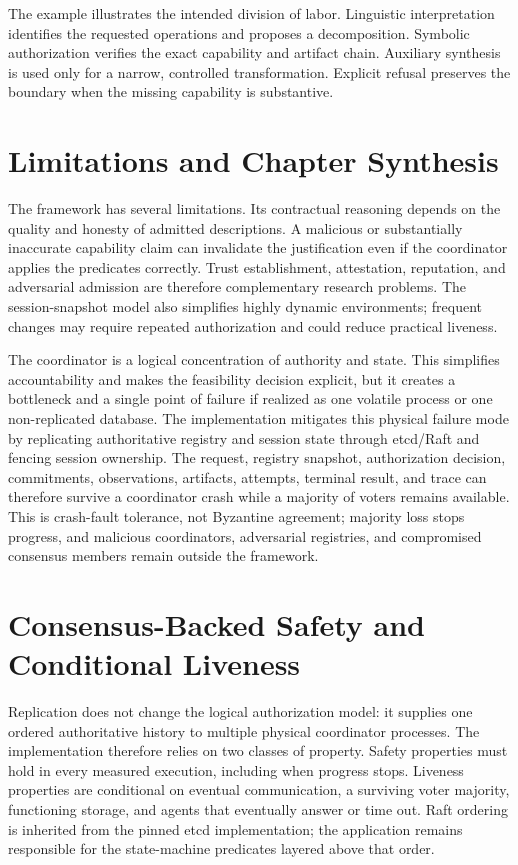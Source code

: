 The example illustrates the intended division of labor. Linguistic interpretation identifies the requested operations and proposes a decomposition. Symbolic authorization verifies the exact capability and artifact chain. Auxiliary synthesis is used only for a narrow, controlled transformation. Explicit refusal preserves the boundary when the missing capability is substantive.

\section{Limitations and Chapter Synthesis}

The framework has several limitations. Its contractual reasoning depends on the quality and honesty of admitted descriptions. A malicious or substantially inaccurate capability claim can invalidate the justification even if the coordinator applies the predicates correctly. Trust establishment, attestation, reputation, and adversarial admission are therefore complementary research problems. The session-snapshot model also simplifies highly dynamic environments; frequent changes may require repeated authorization and could reduce practical liveness.

The coordinator is a logical concentration of authority and state. This simplifies accountability and makes the feasibility decision explicit, but it creates a bottleneck and a single point of failure if realized as one volatile process or one non-replicated database. The implementation mitigates this physical failure mode by replicating authoritative registry and session state through etcd/Raft and fencing session ownership. The request, registry snapshot, authorization decision, commitments, observations, artifacts, attempts, terminal result, and trace can therefore survive a coordinator crash while a majority of voters remains available. This is crash-fault tolerance, not Byzantine agreement; majority loss stops progress, and malicious coordinators, adversarial registries, and compromised consensus members remain outside the framework.

\section{Consensus-Backed Safety and Conditional Liveness}

Replication does not change the logical authorization model: it supplies one ordered authoritative history to multiple physical coordinator processes. The implementation therefore relies on two classes of property. Safety properties must hold in every measured execution, including when progress stops. Liveness properties are conditional on eventual communication, a surviving voter majority, functioning storage, and agents that eventually answer or time out. Raft ordering is inherited from the pinned etcd implementation; the application remains responsible for the state-machine predicates layered above that order.

